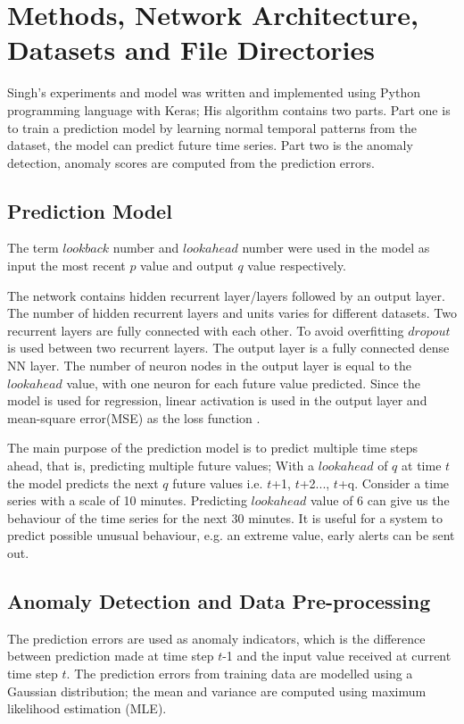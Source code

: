 \documentclass{article}
\begin{document}
\section{Methods, Network Architecture, Datasets and File Directories}

Singh's experiments and model \cite{7-lstmthisis} was written and
implemented using Python
programming language with Keras; His algorithm contains two parts. Part one is
to train a prediction model by learning normal temporal patterns from the
dataset,
the model can predict future time series. Part two is the anomaly detection,
anomaly scores are computed from the prediction errors.


\subsection{Prediction Model}
The term $lookback$ number and $lookahead$ number were used in 
the model as input the most recent $p$ value and output $q$ value respectively.

The network contains hidden recurrent layer/layers followed by an output
layer. The number of hidden recurrent layers and units varies for different
datasets. Two recurrent layers are fully connected with each other. To avoid
overfitting $dropout$ is used between two recurrent layers. The output layer is
a fully connected dense NN layer. The number of neuron nodes in the output
layer is equal to the $lookahead$ value, with one neuron for each future value
predicted. Since the model is used for regression, linear activation is used in
the output layer and mean-square error(MSE) as the loss function
\cite{7-lstmthisis}.

The main purpose of the prediction model is to predict multiple time steps
ahead, that is, predicting multiple future values; With a $lookahead$ of $q$ at
time $t$ the model predicts the next $q$ future values i.e.
$t$+1, $t$+2..., $t$+q. Consider a time series with a scale of 10 minutes.
Predicting $lookahead$ value of 6 can give us the behaviour
of the time series for the next 30 minutes. It is useful for a system to
predict
possible unusual behaviour, e.g. an extreme value, early alerts can be sent
out. 

\subsection{Anomaly Detection and Data Pre-processing}
The prediction errors are used as anomaly indicators, which
is the difference between prediction made at time step $t$-1 and the input
value received at current time step $t$. The prediction errors from training
data are modelled using a Gaussian distribution; the mean and variance are
computed using maximum likelihood estimation (MLE). 
\end{document}
